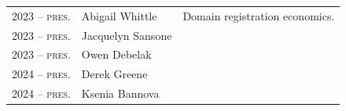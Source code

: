 \documentclass[10pt,singlecolumn]{article} %
\begin{document}
\begin{tabular}{rll}
2023 -- \textsc{pres.} & Abigail Whittle & Domain registration economics.\\ 
2023 -- \textsc{pres.} & Jacquelyn Sansone \\
2023 -- \textsc{pres.} & Owen Debelak \\
2024 -- \textsc{pres.} & Derek Greene \\
2024 -- \textsc{pres.} & Ksenia Bannova \\

\end{tabular}\\
\end{document}
